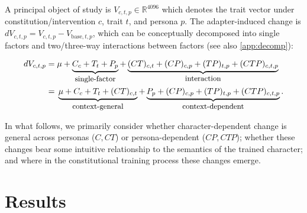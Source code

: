 \documentclass{article}
\begin{document}
A principal object of study is $V_{c,t,p}\in\mathbb{R}^{4096}$ which denotes the trait vector under constitution/intervention $c$, trait $t$, and persona $p$. The adapter-induced change is $dV_{c,t,p}=V_{c,t,p}-V_{\mathrm{base},t,p}$, which can be conceptually decomposed into single factors and two/three-way interactions between factors (see also \ref{app:decomp}):

\begin{equation}
\label{eq:decomp}
\begin{aligned}
dV_{c,t,p}
={}&
\mu
+ \underbrace{C_c + T_t + P_p}_{\text{\footnotesize single-factor}}
+ \underbrace{(CT)_{c,t} + (CP)_{c,p} + (TP)_{t,p} + (CTP)_{c,t,p}}_{\text{\footnotesize interaction}}\\
={}&
\underbrace{\mu + C_c + T_t + (CT)_{c,t}}_{\text{\footnotesize context-general}}
+ \underbrace{P_p + (CP)_{c,p} + (TP)_{t,p} + (CTP)_{c,t,p}}_{\text{\footnotesize context-dependent}}.
\end{aligned}
\end{equation}

In what follows, we primarily consider whether character-dependent change is general across personas (\(C,CT\)) or persona-dependent (\(CP,CTP\)); whether these changes bear some intuitive relationship to the semantics of the trained character; and where in the constitutional training process these changes emerge.

\section{Results}
\end{document}
